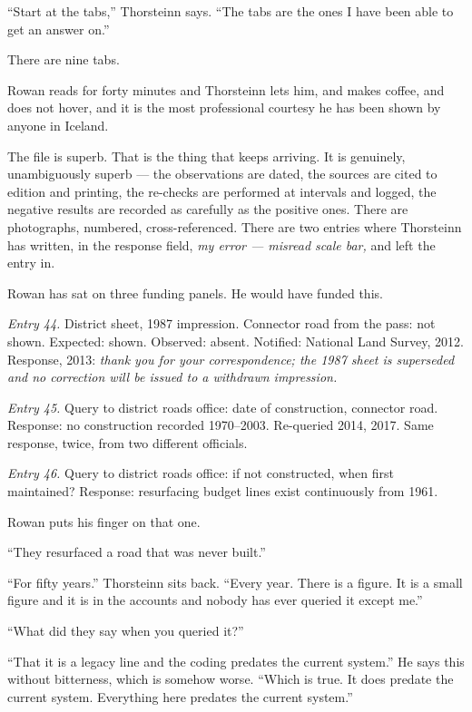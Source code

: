 \documentclass[11pt,oneside]{book}
\newcommand{\sceneline}{%
  \par\vspace{1.2em}
  \begin{center}
    \fontsize{11}{11}\selectfont \textbullet\quad\textbullet\quad\textbullet
  \end{center}
  \vspace{0.6em}\noindent\ignorespaces
}
\begin{document}
``Start at the tabs,'' Thorsteinn says. ``The tabs are the ones I have
been able to get an answer on.''

There are nine tabs.

Rowan reads for forty minutes and Thorsteinn lets him, and makes coffee,
and does not hover, and it is the most professional courtesy he has been
shown by anyone in Iceland.

The file is superb. That is the thing that keeps arriving. It is
genuinely, unambiguously superb --- the observations are dated, the
sources are cited to edition and printing, the re-checks are performed
at intervals and logged, the negative results are recorded as carefully
as the positive ones. There are photographs, numbered, cross-referenced.
There are two entries where Thorsteinn has written, in the response
field, \emph{my error --- misread scale bar,} and left the entry in.

Rowan has sat on three funding panels. He would have funded this.

\emph{Entry 44.} District sheet, 1987 impression. Connector road from
the pass: not shown. Expected: shown. Observed: absent. Notified:
National Land Survey, 2012. Response, 2013: \emph{thank you for your
correspondence; the 1987 sheet is superseded and no correction will be
issued to a withdrawn impression.}

\emph{Entry 45.} Query to district roads office: date of construction,
connector road. Response: no construction recorded 1970--2003.
Re-queried 2014, 2017. Same response, twice, from two different
officials.

\emph{Entry 46.} Query to district roads office: if not constructed,
when first maintained? Response: resurfacing budget lines exist
continuously from 1961.

Rowan puts his finger on that one.

``They resurfaced a road that was never built.''

``For fifty years.'' Thorsteinn sits back. ``Every year. There is a
figure. It is a small figure and it is in the accounts and nobody has
ever queried it except me.''

``What did they say when you queried it?''

``That it is a legacy line and the coding predates the current system.''
He says this without bitterness, which is somehow worse. ``Which is
true. It does predate the current system. Everything here predates the
current system.''

\sceneline
\end{document}
